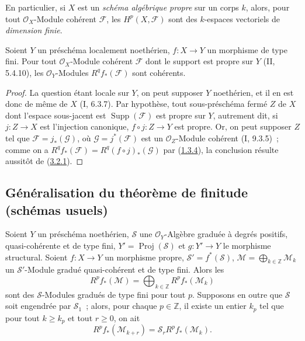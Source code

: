 En particulier, si $X$ est un \emph{schéma algébrique propre} sur un corps
$k$, alors, pour tout $\mathcal O_X$-Module cohérent $\mathcal F$, les
$H^p(X,\mathcal F)$ sont des $k$-espaces vectoriels de \emph{dimension
finie}.

\begin{corollary}[3.2.4]
\label{III.3.2.4-fr}
Soient $Y$ un préschéma localement noethérien, $f:X\to Y$ un morphisme de
type fini. Pour tout $\mathcal O_X$-Module cohérent $\mathcal F$ dont le
support est propre sur $Y$ (II, 5.4.10), les $\mathcal O_Y$-Modules
$R^qf_*(\mathcal F)$ sont cohérents.
\end{corollary}

\begin{proof}
La question étant locale sur $Y$, on peut supposer $Y$ noethérien, et il en
est donc de même de $X$ (I, 6.3.7). Par hypothèse, tout sous-préschéma fermé
$Z$ de $X$ dont l'espace sous-jacent est $\operatorname{Supp}(\mathcal F)$
est propre sur $Y$, autrement dit, si $j:Z\to X$ est l'injection canonique,
$f\circ j:Z\to Y$ est propre. Or, on peut supposer $Z$ tel que
$\mathcal F=j_*(\mathcal G)$, où $\mathcal G=j^*(\mathcal F)$ est un
$\mathcal O_Z$-Module cohérent (I, 9.3.5)~; comme on a
$R^qf_*(\mathcal F)=R^q(f\circ j)_*(\mathcal G)$ par
(\hyperref[III.1.3.4-fr]{1.3.4}), la conclusion résulte aussitôt de
(\hyperref[III.3.2.1-fr]{3.2.1}).
\end{proof}

\subsection{Généralisation du théorème de finitude (schémas usuels)}
\label{subsection:III.3.3-fr}

\begin{proposition}[3.3.1]
\label{III.3.3.1-fr}
Soient $Y$ un préschéma noethérien, $\mathcal S$ une
$\mathcal O_Y$-Algèbre graduée à degrés positifs, quasi-cohérente et de type
fini, $Y'=\operatorname{Proj}(\mathcal S)$ et $g:Y'\to Y$ le morphisme
structural. Soient $f:X\to Y$ un morphisme propre,
$\mathcal S'=f^*(\mathcal S)$,
$\mathcal M=\bigoplus_{k\in\mathbb Z}\mathcal M_k$ un $\mathcal S'$-Module
gradué quasi-cohérent et de type fini. Alors les
\[
R^pf_*(\mathcal M)=\bigoplus_{k\in\mathbb Z}R^pf_*(\mathcal M_k)
\]
sont des $\mathcal S$-Modules gradués de type fini pour tout $p$. Supposons
en outre que $\mathcal S$ soit engendrée par $\mathcal S_1$~; alors, pour
chaque $p\in\mathbb Z$, il existe un entier $k_p$ tel que pour tout
$k\geq k_p$ et tout $r\geq0$, on ait
\[
R^pf_*(\mathcal M_{k+r})=\mathcal S_rR^pf_*(\mathcal M_k).
\tag{3.3.1.1}\label{III.3.3.1.1-fr}
\]
\end{proposition}

